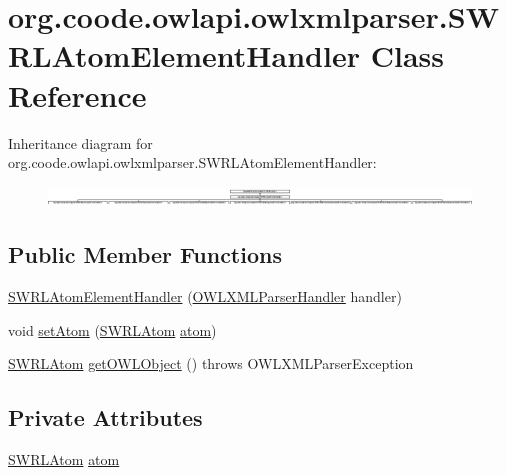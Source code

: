 \hypertarget{classorg_1_1coode_1_1owlapi_1_1owlxmlparser_1_1_s_w_r_l_atom_element_handler}{\section{org.\-coode.\-owlapi.\-owlxmlparser.\-S\-W\-R\-L\-Atom\-Element\-Handler Class Reference}
\label{classorg_1_1coode_1_1owlapi_1_1owlxmlparser_1_1_s_w_r_l_atom_element_handler}
}
Inheritance diagram for org.\-coode.\-owlapi.\-owlxmlparser.\-S\-W\-R\-L\-Atom\-Element\-Handler\-:\begin{figure}[H]
\begin{center}
\leavevmode
\includegraphics[height=0.521739cm]{classorg_1_1coode_1_1owlapi_1_1owlxmlparser_1_1_s_w_r_l_atom_element_handler}
\end{center}
\end{figure}
\subsection*{Public Member Functions}
\begin{DoxyCompactItemize}
\item 
\hyperlink{classorg_1_1coode_1_1owlapi_1_1owlxmlparser_1_1_s_w_r_l_atom_element_handler_a36c828f177c55012050a5528dde9d2cb}{S\-W\-R\-L\-Atom\-Element\-Handler} (\hyperlink{classorg_1_1coode_1_1owlapi_1_1owlxmlparser_1_1_o_w_l_x_m_l_parser_handler}{O\-W\-L\-X\-M\-L\-Parser\-Handler} handler)
\item 
void \hyperlink{classorg_1_1coode_1_1owlapi_1_1owlxmlparser_1_1_s_w_r_l_atom_element_handler_afc81eb6a7813f43839b16a11ce9bcbad}{set\-Atom} (\hyperlink{interfaceorg_1_1semanticweb_1_1owlapi_1_1model_1_1_s_w_r_l_atom}{S\-W\-R\-L\-Atom} \hyperlink{classorg_1_1coode_1_1owlapi_1_1owlxmlparser_1_1_s_w_r_l_atom_element_handler_aaf93c2a838968a7f108fd503e6c68af7}{atom})
\item 
\hyperlink{interfaceorg_1_1semanticweb_1_1owlapi_1_1model_1_1_s_w_r_l_atom}{S\-W\-R\-L\-Atom} \hyperlink{classorg_1_1coode_1_1owlapi_1_1owlxmlparser_1_1_s_w_r_l_atom_element_handler_a7272deeb040afbbf94a023f7c3f7bfc6}{get\-O\-W\-L\-Object} ()  throws O\-W\-L\-X\-M\-L\-Parser\-Exception 
\end{DoxyCompactItemize}
\subsection*{Private Attributes}
\begin{DoxyCompactItemize}
\item 
\hyperlink{interfaceorg_1_1semanticweb_1_1owlapi_1_1model_1_1_s_w_r_l_atom}{S\-W\-R\-L\-Atom} \hyperlink{classorg_1_1coode_1_1owlapi_1_1owlxmlparser_1_1_s_w_r_l_atom_element_handler_aaf93c2a838968a7f108fd503e6c68af7}{atom}
\end{DoxyCompactItemize}


